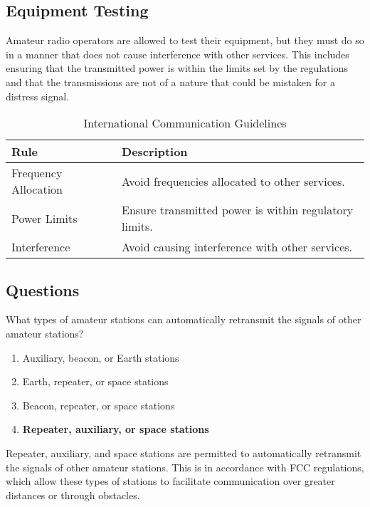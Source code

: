 \subsection*{Equipment Testing}
Amateur radio operators are allowed to test their equipment, but they must do so in a manner that does not cause interference with other services. This includes ensuring that the transmitted power is within the limits set by the regulations and that the transmissions are not of a nature that could be mistaken for a distress signal.

\begin{table}[h!]
    \centering
    \caption{International Communication Guidelines}
    \label{tab:international_rules}
    \begin{tabular}{|l|l|}
        \hline
        \textbf{Rule} & \textbf{Description} \\
        \hline
        Frequency Allocation & Avoid frequencies allocated to other services. \\
        Power Limits & Ensure transmitted power is within regulatory limits. \\
        Interference & Avoid causing interference with other services. \\
        \hline
    \end{tabular}
\end{table}

\subsection*{Questions}

\begin{tcolorbox}[colback=gray!10!white,colframe=black!75!black,title={T1D07}]
    What types of amateur stations can automatically retransmit the signals of other amateur stations?
    \begin{enumerate}[label=\Alph*),noitemsep]
        \item Auxiliary, beacon, or Earth stations
        \item Earth, repeater, or space stations
        \item Beacon, repeater, or space stations
        \item \textbf{Repeater, auxiliary, or space stations}
    \end{enumerate}
\end{tcolorbox}
Repeater, auxiliary, and space stations are permitted to automatically retransmit the signals of other amateur stations. This is in accordance with FCC regulations, which allow these types of stations to facilitate communication over greater distances or through obstacles.


